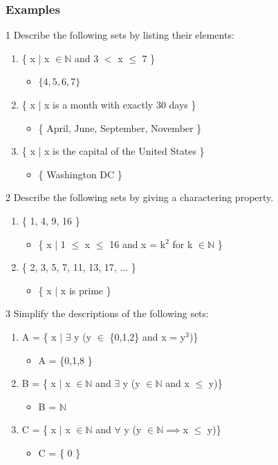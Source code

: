 \documentclass[12pt, letterpaper]{article}
\newcommand{\exheader}[1][ex]{{\tiny{#1}\normalsize}}
\begin{document}
\subsubsection{Examples}
\exheader[1] Describe the following sets by listing their elements:
\begin{enumerate}
	\item \{ x | x $\in \mathbb{N}$ and 3 $<$ x $\le$ 7 \}
	\begin{itemize}[label={\faAngleRight}]
		\item   $\{ 4,5,6,7 \}$
	\end{itemize}
	\item \{ x | x  is a month with exactly 30 days \}
	\begin{itemize}[label={\faAngleRight}]
		\item   \{ April, June, September, November \}
	\end{itemize}
	\item \{ x | x is the capital of the United States \}
	\begin{itemize}[label={\faAngleRight}]
		\item \{ Washington DC \}
	\end{itemize}
\end{enumerate}
\bigbreak
\exheader[2] Describe the following sets by giving a charactering property.
\begin{enumerate}
	\item \{ 1, 4, 9, 16 \}
	\begin{itemize}[label={\faAngleRight}]
		\item \{ x | 1 $\le$ x $\le$ 16 and x = k$^2$ for k $\in \mathbb{N}$ \}
	\end{itemize}
	\item \{ 2, 3, 5, 7, 11, 13, 17, ... \} 
	\begin{itemize}[label={\faAngleRight}]
		\item \{ x | x is prime \}
	\end{itemize}
\end{enumerate}
\bigbreak
\exheader[3] Simplify the descriptions of the following sets:
\begin{enumerate}
	\item A = \{ x | $\exists$ y (y $\in$ \{0,1,2\} and x = y$^3$)\}
	\begin{itemize}
		\item A = \{0,1,8 \}
	\end{itemize}
	\item  B = \{ x | x $\in \mathbb{N}$ and $\exists$ y (y $\in \mathbb{N}$ and x $\le$ y)\}
	\begin{itemize}
		\item B = $\mathbb{N}$
	\end{itemize}
	\item C = \{  x | x $\in \mathbb{N}$ and $\forall$ y (y $\in \mathbb{N} \implies $x $\le$ y)\}
	\begin{itemize}
		\item C = \{ 0 \}
	\end{itemize}
\end{enumerate}
\end{document}

